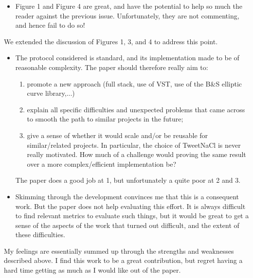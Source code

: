 \begin{itemize}
  \item Figure 1 and Figure 4 are great, and have the potential to help so much the reader against the previous issue. Unfortunately, they are not commenting, and hence fail to do so!
\end{itemize}
\begin{answer}
  We extended the discussion of Figures 1, 3, and 4 to address this point.
\end{answer}
\begin{itemize}
  \item The protocol considered is standard, and its implementation made to be of reasonable complexity. The paper should therefore really aim to:
        \begin{enumerate}
          \item promote a new approach (full stack, use of VST, use of the B\&S elliptic curve library,...)
          \item explain all specific difficulties and unexpected problems that came across to smooth the path to similar projects in the future;
          \item give a sense of whether it would scale and/or be reusable for similar/related projects. In particular, the choice of TweetNaCl is never really motivated. How much of a challenge would proving the same result over a more complex/efficient implementation be?
        \end{enumerate}

        The paper does a good job at 1, but unfortunately a quite poor at 2 and 3.
  \item Skimming through the development convinces me that this is a consequent work. But the paper does not help evaluating this effort. It is always difficult to find relevant metrics to evaluate such things, but it would be great to get a sense of the aspects of the work that turned out difficult, and the extent of these difficulties.
\end{itemize}
\begin{answer}
\end{answer}


\begin{center}
\end{center}
My feelings are essentially summed up through the strengths and weaknesses described above. I find this work to be a great contribution, but regret having a hard time getting as much as I would like out of the paper.

